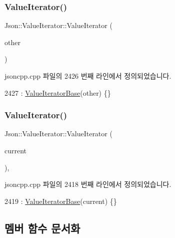 \subsubsection{\texorpdfstring{Value\+Iterator()}{ValueIterator()}\hspace{0.1cm}{\footnotesize\ttfamily [3/4]}}
{\footnotesize\ttfamily Json\+::\+Value\+Iterator\+::\+Value\+Iterator (\begin{DoxyParamCaption}\item[{const \hyperlink{class_json_1_1_value_iterator}{Value\+Iterator} \&}]{other }\end{DoxyParamCaption})}



jsoncpp.\+cpp 파일의 2426 번째 라인에서 정의되었습니다.


\begin{DoxyCode}
2427     : \hyperlink{class_json_1_1_value_iterator_base_af45b028d9ff9cbd2554a87878b42dd75}{ValueIteratorBase}(other) \{\}
\end{DoxyCode}
\mbox{\label{class_json_1_1_value_iterator_afb06ea21add440c78c27dc49570460a5}} 
\subsubsection{\texorpdfstring{Value\+Iterator()}{ValueIterator()}\hspace{0.1cm}{\footnotesize\ttfamily [4/4]}}
{\footnotesize\ttfamily Json\+::\+Value\+Iterator\+::\+Value\+Iterator (\begin{DoxyParamCaption}\item[{const Value\+::\+Object\+Values\+::iterator \&}]{current }\end{DoxyParamCaption})\hspace{0.3cm}{\ttfamily [explicit]}, {\ttfamily [private]}}



jsoncpp.\+cpp 파일의 2418 번째 라인에서 정의되었습니다.


\begin{DoxyCode}
2419     : \hyperlink{class_json_1_1_value_iterator_base_af45b028d9ff9cbd2554a87878b42dd75}{ValueIteratorBase}(current) \{\}
\end{DoxyCode}


\subsection{멤버 함수 문서화}
\mbox{\label{class_json_1_1_value_iterator_base_af11473c9e20d07782e42b52a2f9e4540}} 

